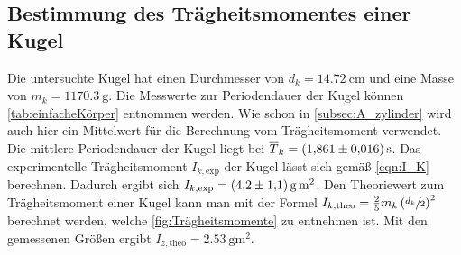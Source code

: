 \subsection{Bestimmung des Trägheitsmomentes einer Kugel}
\label{subsec:A_kugel}
Die untersuchte Kugel hat einen Durchmesser von $d_k = \qty{14.72}{\centi\metre}$ und eine Masse von $m_k = \qty{1170.3}{\gram}$. Die Messwerte zur Periodendauer der Kugel
können \autoref{tab:einfacheKörper} entnommen werden. Wie schon in \autoref{subsec:A_zylinder} wird auch hier ein Mittelwert für die Berechnung vom Trägheitsmoment
verwendet. Die mittlere Periodendauer der Kugel liegt bei $\overline{T}_k = \qty{1.861+-0.016}{\second}$. Das experimentelle Trägheitsmoment $I_{k,\text{exp}}$ der Kugel 
lässt sich gemäß \autoref{eqn:I_K} berechnen. Dadurch ergibt sich $I_{k,\text{exp}} = \qty{4.2+-1.1}{\gram\metre\squared}$. Den Theoriewert zum Trägheitsmoment einer Kugel
kann man mit der Formel $I_{k,\text{theo}} = \frac{2}{5}m_k\left(\sfrac{d_k}{2}\right)^2$ berechnet werden, welche \autoref{fig:Trägheitsmomente} zu entnehmen ist.
Mit den gemessenen Größen ergibt $I_{z,\text{theo}} = \qty{2.53}{\gram\metre\squared}$. 
